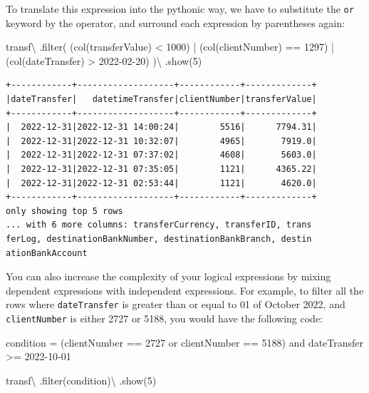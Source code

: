 \documentclass[
  11pt,
  letterpaper,
  DIV=11,
  numbers=noendperiod]{scrreprt}
\newenvironment{Shaded}{\begin{snugshade}}{\end{snugshade}}
\newcommand{\BuiltInTok}[1]{\textcolor[rgb]{0.00,0.23,0.31}{#1}}
\newcommand{\DecValTok}[1]{\textcolor[rgb]{0.68,0.00,0.00}{#1}}
\newcommand{\NormalTok}[1]{\textcolor[rgb]{0.00,0.23,0.31}{#1}}
\newcommand{\OperatorTok}[1]{\textcolor[rgb]{0.37,0.37,0.37}{#1}}
\newcommand{\StringTok}[1]{\textcolor[rgb]{0.13,0.47,0.30}{#1}}
\begin{document}
To translate this expression into the pythonic way, we have to
substitute the \texttt{or} keyword by the \texttt{\textbar{}} operator,
and surround each expression by parentheses again:

\begin{Shaded}
\begin{Highlighting}[]
\NormalTok{transf}\OperatorTok{\textbackslash{}}
\NormalTok{  .}\BuiltInTok{filter}\NormalTok{(}
\NormalTok{    (col(}\StringTok{\textquotesingle{}transferValue\textquotesingle{}}\NormalTok{) }\OperatorTok{\textless{}} \DecValTok{1000}\NormalTok{) }\OperatorTok{|}
\NormalTok{    (col(}\StringTok{\textquotesingle{}clientNumber\textquotesingle{}}\NormalTok{) }\OperatorTok{==} \DecValTok{1297}\NormalTok{) }\OperatorTok{|}
\NormalTok{    (col(}\StringTok{\textquotesingle{}dateTransfer\textquotesingle{}}\NormalTok{) }\OperatorTok{\textgreater{}} \StringTok{\textquotesingle{}2022{-}02{-}20\textquotesingle{}}\NormalTok{)}
\NormalTok{  )}\OperatorTok{\textbackslash{}}
\NormalTok{  .show(}\DecValTok{5}\NormalTok{)}
\end{Highlighting}
\end{Shaded}

\begin{verbatim}
+------------+-------------------+------------+-------------+
|dateTransfer|   datetimeTransfer|clientNumber|transferValue|
+------------+-------------------+------------+-------------+
|  2022-12-31|2022-12-31 14:00:24|        5516|      7794.31|
|  2022-12-31|2022-12-31 10:32:07|        4965|       7919.0|
|  2022-12-31|2022-12-31 07:37:02|        4608|       5603.0|
|  2022-12-31|2022-12-31 07:35:05|        1121|      4365.22|
|  2022-12-31|2022-12-31 02:53:44|        1121|       4620.0|
+------------+-------------------+------------+-------------+
only showing top 5 rows
... with 6 more columns: transferCurrency, transferID, trans
ferLog, destinationBankNumber, destinationBankBranch, destin
ationBankAccount
\end{verbatim}

You can also increase the complexity of your logical expressions by
mixing dependent expressions with independent expressions. For example,
to filter all the rows where \texttt{dateTransfer} is greater than or
equal to 01 of October 2022, and \texttt{clientNumber} is either 2727 or
5188, you would have the following code:

\begin{Shaded}
\begin{Highlighting}[]
\NormalTok{condition }\OperatorTok{=} \StringTok{\textquotesingle{}\textquotesingle{}\textquotesingle{}}
\StringTok{  (clientNumber == 2727 or clientNumber == 5188)}
\StringTok{  and dateTransfer \textgreater{}= \textquotesingle{}2022{-}10{-}01\textquotesingle{}}
\StringTok{\textquotesingle{}\textquotesingle{}\textquotesingle{}}

\NormalTok{transf}\OperatorTok{\textbackslash{}}
\NormalTok{  .}\BuiltInTok{filter}\NormalTok{(condition)}\OperatorTok{\textbackslash{}}
\NormalTok{  .show(}\DecValTok{5}\NormalTok{)}
\end{Highlighting}
\end{Shaded}
\end{document}
